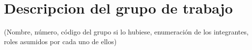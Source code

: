 \section{Descripcion del grupo de trabajo}
\paragraph*{}
(Nombre, número, código del grupo si lo hubiese, enumeración de los integrantes, roles asumidos por  cada uno de ellos)
